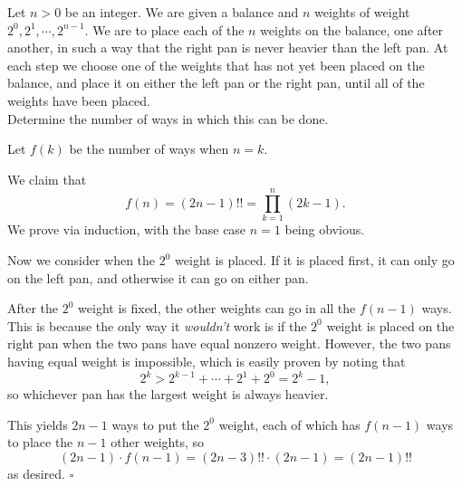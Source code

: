 
\begin{problem}[ISL 2011 C1]
    Let $n > 0$ be an integer. We are given a balance and $n$ weights
    of weight $2^0, 2^1, \cdots, 2^{n-1}$. We are to place each of the
    $n$ weights on the balance, one after another, in such a way that
    the right pan is never heavier than the left pan. At each step we
    choose one of the weights that has not yet been placed on the balance,
    and place it on either the left pan or the right pan, until all of
    the weights have been placed. \\
    Determine the number of ways in which this can be done.
\end{problem}

\begin{solution}
    Let $f(k)$ be the number of ways when $n=k$.

    We claim that \[f(n) = (2n-1)!! = \prod_{k=1}^n (2k-1).\]
    We prove via induction, with the base case $n=1$ being obvious.

    Now we consider when the $2^0$ weight is placed. If it is placed
    first, it can only go on the left pan, and otherwise it can go on
    either pan.

    After the $2^0$ weight is fixed, the other weights can go in all
    the $f(n-1)$ ways. This is because the only way it \textit{wouldn't}
    work is if the $2^0$ weight is placed on the right pan when the
    two pans have equal nonzero weight. However, the two pans having
    equal weight is impossible, which is easily proven by noting that
    \[2^k > 2^{k-1} + \cdots + 2^1 + 2^0 = 2^k-1,\]
    so whichever pan has the largest weight is always heavier.
    
    This yields $2n-1$ ways to put the $2^0$ weight, each of which
    has $f(n-1)$ ways to place the $n-1$ other weights, so
    \[(2n-1) \cdot f(n-1) = (2n-3)!! \cdot (2n-1) = (2n-1)!!\]
    as desired. $\square$
\end{solution}
